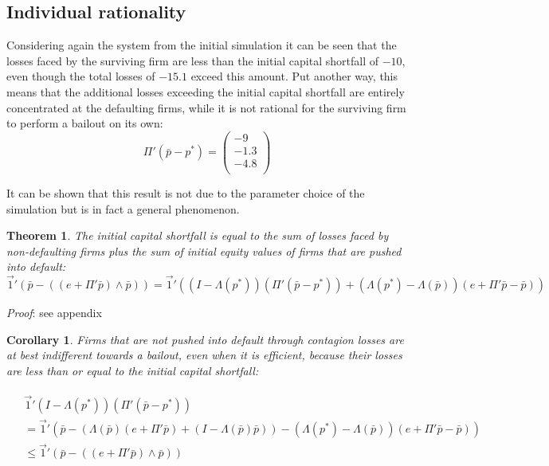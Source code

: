 \documentclass[12pt,a4paper]{article}
\newtheorem{theorem}{Theorem}
\newtheorem{corollary}{Corollary}
\begin{document}
\subsection{Individual rationality}
Considering again the system from the initial simulation it can be seen that the losses faced by the surviving firm are less than the initial capital shortfall of $-10$, even though the total losses of $-15.1$ exceed this amount. Put another way, this means that the additional losses exceeding the initial capital shortfall are entirely concentrated at the defaulting firms, while it is not rational for the surviving firm to perform a bailout on its own:
\[
\Pi' (\bar{p}-p^* )=
\begin{pmatrix}
-9 \\
-1.3 \\
-4.8 \\
\end{pmatrix}
\]

It can be shown that this result is not due to the parameter choice of the simulation but is in fact a general phenomenon.

\begin{theorem} \label{the:shortfall}
The initial capital shortfall is equal to the sum of losses faced by non-defaulting firms plus the sum of initial equity values of firms that are pushed into default:
\[
\vec{1}' (\bar{p}-((e+\Pi' \bar{p}) \wedge \bar{p}))= \vec{1}' ((I-\Lambda(p^* ))(\Pi' (\bar{p}-p^* ))+(\Lambda(p^* )-\Lambda(\bar{p}))(e+\Pi' \bar{p}-\bar{p}))
\]
\end{theorem}

\textit{Proof}: see appendix

\begin{corollary} \label{cor:indifferent}
Firms that are not pushed into default through contagion losses are at best indifferent towards a bailout, even when it is efficient, because their losses are less than or equal to the initial capital shortfall:

\begin{align*}
\begin{split}
& \vec{1}' (I-\Lambda(p^* ))(\Pi' (\bar{p}-p^* )) \\
& = \vec{1}' (\bar{p}-(\Lambda(\bar{p})(e+\Pi' \bar{p})+(I-\Lambda(\bar{p}) \bar{p}))-(\Lambda(p^* )-\Lambda(\bar{p}))(e+\Pi' \bar{p}-\bar{p})) \\
& \le \vec{1}' (\bar{p}-((e+\Pi' \bar{p}) \wedge \bar{p}))
\end{split}
\end{align*}
\end{corollary}
\end{document}
